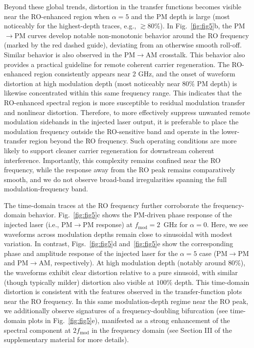 \documentclass[%
 aip,
 apl,
 amsmath,amssymb,
 reprint,%
 floatfix,
]{revtex4-1}
\begin{document}
Beyond these global trends, distortion in the transfer functions becomes visible near the RO-enhanced region when $\alpha=5$ and the PM depth is large (most noticeably for the highest-depth traces, e.g., $\gtrsim 80\%$). In Fig.~\ref{fig:fig5}b, the PM$\to$PM curves develop notable non-monotonic behavior around the RO frequency (marked by the red dashed guide), deviating from an otherwise smooth roll-off. Similar behavior is also observed in the PM$\to$AM crosstalk.
This behavior also provides a practical guideline for remote coherent carrier regeneration. The RO-enhanced region consistently appears near 2 GHz, and the onset of waveform distortion at high modulation depth (most noticeably near $80\%$ PM depth) is likewise concentrated within this same frequency range. This indicates that the RO-enhanced spectral region is more susceptible to residual modulation transfer and nonlinear distortion. Therefore, to more effectively suppress unwanted remote modulation sidebands in the injected laser output, it is preferable to place the modulation frequency outside the RO-sensitive band and operate in the lower-transfer region beyond the RO frequency. Such operating conditions are more likely to support cleaner carrier regeneration for downstream coherent interference.
Importantly, this complexity remains confined near the RO frequency, while the response away from the RO peak remains comparatively smooth, and we do not observe broad-band irregularities spanning the full modulation-frequency band.

The time-domain traces at the RO frequency further corroborate the frequency-domain behavior. Fig.~\ref{fig:fig5}c shows the PM-driven phase response of the injected laser (i.e., PM$\to$PM response) at $f_{\mathrm{mod}}=2$~GHz for $\alpha=0$. Here, we see waveforms across modulation depths remain close to sinusoidal with modest variation. In contrast, Figs.~\ref{fig:fig5}d and~\ref{fig:fig5}e show the corresponding phase and amplitude response of the injected laser for the $\alpha=5$ case (PM$\to$PM and PM$\to$AM, respectively). At high modulation depth (notably around $80\%$), the waveforms exhibit clear distortion relative to a pure sinusoid, with similar (though typically milder) distortion also visible at $100\%$ depth. This time-domain distortion is consistent with the features observed in the transfer-function plots near the RO frequency. In this same modulation-depth regime near the RO peak, we additionally observe signatures of a frequency-doubling bifurcation (see time-domain plots in Fig.~\ref{fig:fig5}e), manifested as a strong enhancement of the spectral component at $2f_{\mathrm{mod}}$ in the frequency domain (see Section III of the supplementary material for more details).
\end{document}
